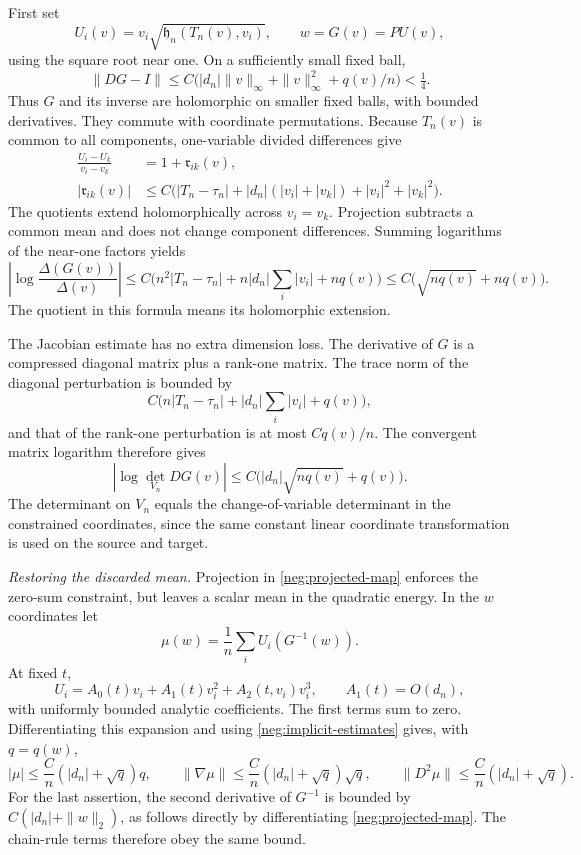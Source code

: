 \documentclass[11pt]{article}
\numberwithin{equation}{section}
\theoremstyle{definition}
\begin{document}
First set
\begin{equation}
 U_i(v)=v_i\sqrt{\mathfrak h_n(T_n(v),v_i)},\qquad
 w=G(v)=P U(v),
 \label{neg:projected-map}
\end{equation}
using the square root near one.  On a sufficiently small fixed ball,
\[
 \|DG-I\|\le
 C\bigl(|d_n|\|v\|_\infty+\|v\|_\infty^2+q(v)/n\bigr)<\tfrac14 .
 \]
Thus \(G\) and its inverse are holomorphic on smaller fixed balls,
with bounded derivatives.  They commute with coordinate
permutations.  Because \(T_n(v)\) is common to all components,
one-variable divided differences give
\begin{align}
 \frac{U_i-U_k}{v_i-v_k}&=1+\mathfrak r_{ik}(v),\\
 |\mathfrak r_{ik}(v)|
 &\le C\bigl(
 |T_n-\tau_n|+|d_n|(|v_i|+|v_k|)
                   +|v_i|^2+|v_k|^2\bigr).
 \label{neg:pair-divided}
\end{align}
The quotients extend holomorphically across \(v_i=v_k\).
Projection subtracts a common mean and does not change
component differences.  Summing logarithms of the near-one
factors yields
\begin{equation}
 \left|\log\frac{\Delta(G(v))}{\Delta(v)}\right|
 \le C\bigl(n^2|T_n-\tau_n|
              +n|d_n|\sum_i|v_i|+nq(v)\bigr)
 \le C\bigl(\sqrt{nq(v)}+nq(v)\bigr).
 \label{neg:G-vandermonde}
\end{equation}
The quotient in this formula means its holomorphic extension.

The Jacobian estimate has no extra dimension loss.  The
derivative of \(G\) is a compressed diagonal matrix plus a
rank-one matrix.  The trace norm of the diagonal perturbation
is bounded by
\[
 C\bigl(n|T_n-\tau_n|+|d_n|\sum_i|v_i|+q(v)\bigr),
 \]
and that of the rank-one perturbation is at most \(Cq(v)/n\).
The convergent matrix logarithm therefore gives
\begin{equation}
 |\log\det_{V_n}DG(v)|
 \le C\bigl(|d_n|\sqrt{nq(v)}+q(v)\bigr).
 \label{neg:G-jacobian}
\end{equation}
The determinant on \(V_n\) equals the change-of-variable
determinant in the constrained coordinates, since the same
constant linear coordinate transformation is used on the
source and target.

\emph{Restoring the discarded mean.}
Projection in \eqref{neg:projected-map} enforces the zero-sum
constraint, but leaves a scalar mean in the quadratic energy.
In the \(w\) coordinates let
\[
 \mu(w)=\frac1n\sum_i U_i(G^{-1}(w)).
 \]
At fixed \(t\),
\[
 U_i=A_0(t)v_i+A_1(t)v_i^2+A_2(t,v_i)v_i^3,
 \qquad A_1(t)=O(d_n),
 \]
with uniformly bounded analytic coefficients.  The first terms
sum to zero.  Differentiating this expansion and using
\eqref{neg:implicit-estimates} gives, with \(q=q(w)\),
\begin{equation}
 |\mu|\le\frac Cn(|d_n|+\sqrt q)q,\qquad
 \|\nabla\mu\|\le\frac Cn(|d_n|+\sqrt q)\sqrt q,\qquad
 \|D^2\mu\|\le\frac Cn(|d_n|+\sqrt q).
 \label{neg:mean-estimates}
\end{equation}
For the last assertion, the second derivative of \(G^{-1}\)
is bounded by \(C(|d_n|+\|w\|_2)\), as follows directly by
differentiating \eqref{neg:projected-map}.  The chain-rule
terms therefore obey the same bound.
\end{document}
